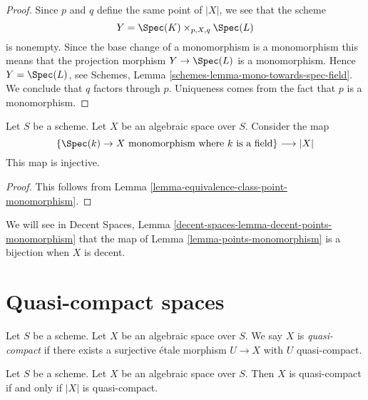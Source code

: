 \begin{proof}
Since $p$ and $q$ define the same point of $|X|$, we see that the scheme
$$
Y = \Spec(K) \times_{p, X, q} \Spec(L)
$$
is nonempty. Since the base change of a monomorphism is a monomorphism
this means that the projection morphism $Y \to \Spec(L)$
is a monomorphism. Hence $Y = \Spec(L)$, see
Schemes, Lemma \ref{schemes-lemma-mono-towards-spec-field}.
We conclude that $q$ factors through $p$. Uniqueness
comes from the fact that $p$ is a monomorphism.
\end{proof}

\begin{lemma}
\label{lemma-points-monomorphism}
Let $S$ be a scheme. Let $X$ be an algebraic space over $S$.
Consider the map
$$
\{\Spec(k) \to X \text{ monomorphism where }k\text{ is a field}\}
\longrightarrow
|X|
$$
This map is injective.
\end{lemma}

\begin{proof}
This follows from Lemma \ref{lemma-equivalence-class-point-monomorphism}.
\end{proof}

\noindent
We will see in Decent Spaces,
Lemma \ref{decent-spaces-lemma-decent-points-monomorphism}
that the map of Lemma \ref{lemma-points-monomorphism}
is a bijection when $X$ is decent.

















\section{Quasi-compact spaces}
\label{section-quasi-compact}

\begin{definition}
\label{definition-quasi-compact}
Let $S$ be a scheme.
Let $X$ be an algebraic space over $S$.
We say $X$ is {\it quasi-compact} if there exists a surjective
\'etale morphism $U \to X$ with $U$ quasi-compact.
\end{definition}

\begin{lemma}
\label{lemma-quasi-compact-space}
Let $S$ be a scheme.
Let $X$ be an algebraic space over $S$.
Then $X$ is quasi-compact if and only if $|X|$ is quasi-compact.
\end{lemma}

